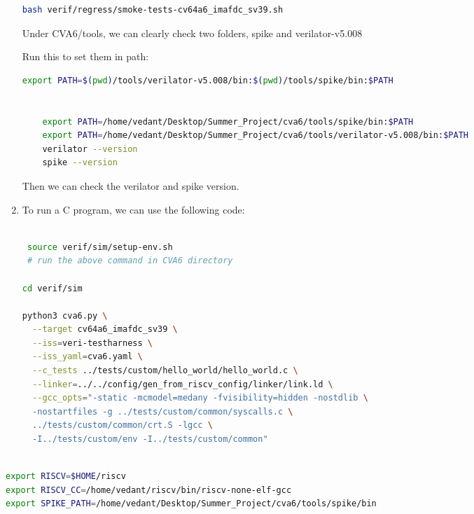 \documentclass[12pt, a4paper]{article}
\begin{document}
\begin{enumerate}
\begin{lstlisting}[language=bash, frame=single, basicstyle=\ttfamily\footnotesize,numbers = none]
        bash verif/regress/smoke-tests-cv64a6_imafdc_sv39.sh
         \end{lstlisting}

        Under CVA6/tools, we can clearly check two folders, spike and verilator-v5.008

        Run this to set them in path:
        
         \begin{lstlisting}[language=bash, frame=single, basicstyle=\ttfamily\footnotesize, numbers = none]
    export PATH=$(pwd)/tools/verilator-v5.008/bin:$(pwd)/tools/spike/bin:$PATH
    
    
    export PATH=/home/vedant/Desktop/Summer_Project/cva6/tools/spike/bin:$PATH
    export PATH=/home/vedant/Desktop/Summer_Project/cva6/tools/verilator-v5.008/bin:$PATH
    verilator --version
    spike --version
         \end{lstlisting}

         Then we can check the verilator and spike version.

    \item To run a C program, we can use the following code:

     \begin{lstlisting}[language=bash, 
 numbers = none, frame=single, basicstyle=\ttfamily\footnotesize]

 source verif/sim/setup-env.sh
 # run the above command in CVA6 directory
 
cd verif/sim

python3 cva6.py \
  --target cv64a6_imafdc_sv39 \
  --iss=veri-testharness \
  --iss_yaml=cva6.yaml \
  --c_tests ../tests/custom/hello_world/hello_world.c \
  --linker=../../config/gen_from_riscv_config/linker/link.ld \
  --gcc_opts="-static -mcmodel=medany -fvisibility=hidden -nostdlib \
  -nostartfiles -g ../tests/custom/common/syscalls.c \
  ../tests/custom/common/crt.S -lgcc \
  -I../tests/custom/env -I../tests/custom/common"
  \end{lstlisting}
\end{enumerate}

 \begin{lstlisting}[language=bash, 
 numbers = none, frame=single, basicstyle=\ttfamily\footnotesize]
 
export RISCV=$HOME/riscv
export RISCV_CC=/home/vedant/riscv/bin/riscv-none-elf-gcc
export SPIKE_PATH=/home/vedant/Desktop/Summer_Project/cva6/tools/spike/bin

\end{lstlisting}
\end{document}
